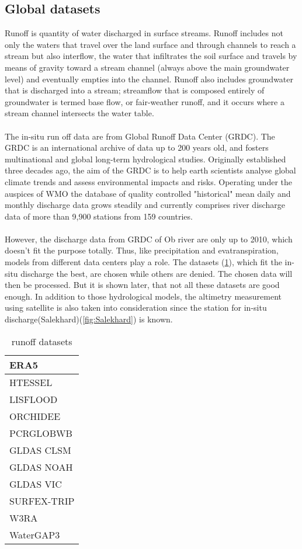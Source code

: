 \subsection{Global datasets}
Runoff is quantity of water discharged in surface streams. Runoff includes not only the waters that travel over the land surface and through channels to reach a stream but also interflow, the water that infiltrates the soil surface and travels by means of gravity toward a stream channel (always above the main groundwater level) and eventually empties into the channel. Runoff also includes groundwater that is discharged into a stream; streamflow that is composed entirely of groundwater is termed base flow, or fair-weather runoff, and it occurs where a stream channel intersects the water table.\\\\
The in-situ run off data are from Global Runoff Data Center (GRDC). The GRDC is an international archive of data up to 200 years old, and fosters multinational and global long-term hydrological studies. Originally established three decades ago, the aim of the GRDC is to help earth scientists analyse global climate trends and assess environmental impacts and risks. Operating under the auspices of WMO the database of quality controlled "historical" mean daily and monthly discharge data grows steadily and currently comprises river discharge data of more than 9,900 stations from 159 countries.\\\\
However, the discharge data from GRDC of Ob river are only up to 2010, which doesn't fit the purpose totally. Thus, like precipitation and evatranspiration, models from different data centers play a role. The datasets (\ref{tab:runoff}), which fit the in-situ discharge the best, are chosen while others are denied. The chosen data will then be processed. But it is shown later, that not all these datasets are good enough. In addition to those hydrological models, the altimetry measurement using satellite is also taken into consideration since the station for in-situ discharge(Salekhard)(\ref{fig:Salekhard}) is known. 
\begin{table}[htbp]\centering
	\label{tab:runoff}
	\begin{tabular}{|l|}
		\hline
		ERA5        \\ \hline
		HTESSEL     \\ \hline
		LISFLOOD    \\ \hline
		ORCHIDEE    \\ \hline
		PCRGLOBWB   \\ \hline
		GLDAS CLSM  \\ \hline
		GLDAS NOAH  \\ \hline
		GLDAS VIC   \\ \hline
		SURFEX-TRIP \\ \hline
		W3RA        \\ \hline
		WaterGAP3   \\ \hline
	\end{tabular}
	\caption{runoff datasets}
\end{table}
